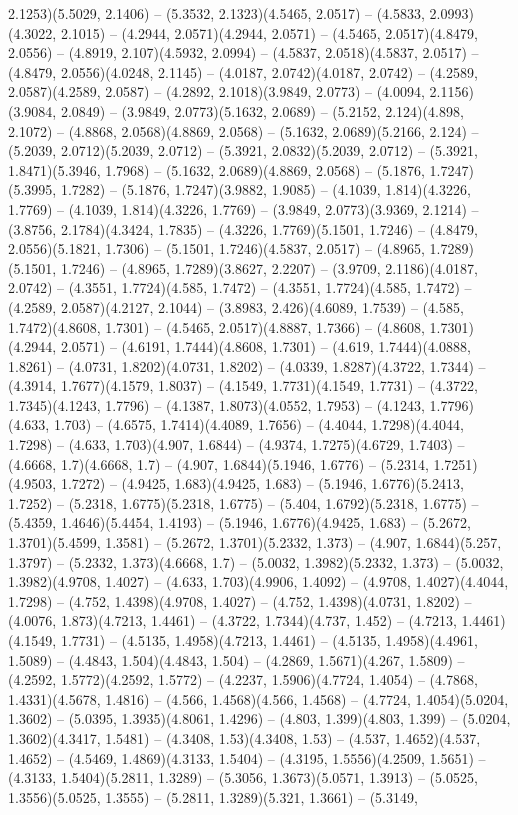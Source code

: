 2.1253)(5.5029, 2.1406) -- (5.3532, 2.1323)(4.5465, 2.0517) -- (4.5833, 2.0993)(4.3022, 2.1015) -- (4.2944, 2.0571)(4.2944, 2.0571) -- (4.5465, 2.0517)(4.8479, 2.0556) -- (4.8919, 2.107)(4.5932, 2.0994) -- (4.5837, 2.0518)(4.5837, 2.0517) -- (4.8479, 2.0556)(4.0248, 2.1145) -- (4.0187, 2.0742)(4.0187, 2.0742) -- (4.2589, 2.0587)(4.2589, 2.0587) -- (4.2892, 2.1018)(3.9849, 2.0773) -- (4.0094, 2.1156)(3.9084, 2.0849) -- (3.9849, 2.0773)(5.1632, 2.0689) -- (5.2152, 2.124)(4.898, 2.1072) -- (4.8868, 2.0568)(4.8869, 2.0568) -- (5.1632, 2.0689)(5.2166, 2.124) -- (5.2039, 2.0712)(5.2039, 2.0712) -- (5.3921, 2.0832)(5.2039, 2.0712) -- (5.3921, 1.8471)(5.3946, 1.7968) -- (5.1632, 2.0689)(4.8869, 2.0568) -- (5.1876, 1.7247)(5.3995, 1.7282) -- (5.1876, 1.7247)(3.9882, 1.9085) -- (4.1039, 1.814)(4.3226, 1.7769) -- (4.1039, 1.814)(4.3226, 1.7769) -- (3.9849, 2.0773)(3.9369, 2.1214) -- (3.8756, 2.1784)(4.3424, 1.7835) -- (4.3226, 1.7769)(5.1501, 1.7246) -- (4.8479, 2.0556)(5.1821, 1.7306) -- (5.1501, 1.7246)(4.5837, 2.0517) -- (4.8965, 1.7289)(5.1501, 1.7246) -- (4.8965, 1.7289)(3.8627, 2.2207) -- (3.9709, 2.1186)(4.0187, 2.0742) -- (4.3551, 1.7724)(4.585, 1.7472) -- (4.3551, 1.7724)(4.585, 1.7472) -- (4.2589, 2.0587)(4.2127, 2.1044) -- (3.8983, 2.426)(4.6089, 1.7539) -- (4.585, 1.7472)(4.8608, 1.7301) -- (4.5465, 2.0517)(4.8887, 1.7366) -- (4.8608, 1.7301)(4.2944, 2.0571) -- (4.6191, 1.7444)(4.8608, 1.7301) -- (4.619, 1.7444)(4.0888, 1.8261) -- (4.0731, 1.8202)(4.0731, 1.8202) -- (4.0339, 1.8287)(4.3722, 1.7344) -- (4.3914, 1.7677)(4.1579, 1.8037) -- (4.1549, 1.7731)(4.1549, 1.7731) -- (4.3722, 1.7345)(4.1243, 1.7796) -- (4.1387, 1.8073)(4.0552, 1.7953) -- (4.1243, 1.7796)(4.633, 1.703) -- (4.6575, 1.7414)(4.4089, 1.7656) -- (4.4044, 1.7298)(4.4044, 1.7298) -- (4.633, 1.703)(4.907, 1.6844) -- (4.9374, 1.7275)(4.6729, 1.7403) -- (4.6668, 1.7)(4.6668, 1.7) -- (4.907, 1.6844)(5.1946, 1.6776) -- (5.2314, 1.7251)(4.9503, 1.7272) -- (4.9425, 1.683)(4.9425, 1.683) -- (5.1946, 1.6776)(5.2413, 1.7252) -- (5.2318, 1.6775)(5.2318, 1.6775) -- (5.404, 1.6792)(5.2318, 1.6775) -- (5.4359, 1.4646)(5.4454, 1.4193) -- (5.1946, 1.6776)(4.9425, 1.683) -- (5.2672, 1.3701)(5.4599, 1.3581) -- (5.2672, 1.3701)(5.2332, 1.373) -- (4.907, 1.6844)(5.257, 1.3797) -- (5.2332, 1.373)(4.6668, 1.7) -- (5.0032, 1.3982)(5.2332, 1.373) -- (5.0032, 1.3982)(4.9708, 1.4027) -- (4.633, 1.703)(4.9906, 1.4092) -- (4.9708, 1.4027)(4.4044, 1.7298) -- (4.752, 1.4398)(4.9708, 1.4027) -- (4.752, 1.4398)(4.0731, 1.8202) -- (4.0076, 1.873)(4.7213, 1.4461) -- (4.3722, 1.7344)(4.737, 1.452) -- (4.7213, 1.4461)(4.1549, 1.7731) -- (4.5135, 1.4958)(4.7213, 1.4461) -- (4.5135, 1.4958)(4.4961, 1.5089) -- (4.4843, 1.504)(4.4843, 1.504) -- (4.2869, 1.5671)(4.267, 1.5809) -- (4.2592, 1.5772)(4.2592, 1.5772) -- (4.2237, 1.5906)(4.7724, 1.4054) -- (4.7868, 1.4331)(4.5678, 1.4816) -- (4.566, 1.4568)(4.566, 1.4568) -- (4.7724, 1.4054)(5.0204, 1.3602) -- (5.0395, 1.3935)(4.8061, 1.4296) -- (4.803, 1.399)(4.803, 1.399) -- (5.0204, 1.3602)(4.3417, 1.5481) -- (4.3408, 1.53)(4.3408, 1.53) -- (4.537, 1.4652)(4.537, 1.4652) -- (4.5469, 1.4869)(4.3133, 1.5404) -- (4.3195, 1.5556)(4.2509, 1.5651) -- (4.3133, 1.5404)(5.2811, 1.3289) -- (5.3056, 1.3673)(5.0571, 1.3913) -- (5.0525, 1.3556)(5.0525, 1.3555) -- (5.2811, 1.3289)(5.321, 1.3661) -- (5.3149, 